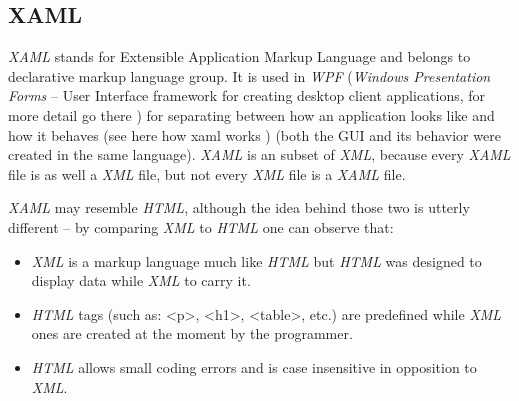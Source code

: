 \subsection{XAML}
    \textit{XAML} stands for Extensible Application Markup Language and belongs to declarative markup language group. It is used in \textit{WPF} (\textit{Windows Presentation Forms} -- User Interface framework for creating desktop client applications, for more detail go there \cite{wpf}) for separating between how an application looks like and how it behaves (see here how xaml works \cite{how_xaml_works}) (both the GUI and its behavior were created in the same language). \textit{XAML} is an subset of \textit{XML}, because every \textit{XAML} file is as well a \textit{XML} file, but not every \textit{XML} file is a \textit{XAML} file.
    
    \textit{XAML} may resemble \textit{HTML}, although the idea behind those two is utterly different -- by comparing \textit{XML} to \textit{HTML} one can observe that:
    \begin{itemize}
        \item \textit{XML} is a markup language much like \textit{HTML} but \textit{HTML} was designed to display data while \textit{XML} to carry it.
        \item \textit{HTML} tags (such as: <p>, <h1>, <table>, etc.) are predefined while \textit{XML} ones are created at the moment by the programmer.
        \item \textit{HTML} allows small coding errors and is case insensitive in opposition to \textit{XML}.
    \end{itemize}
